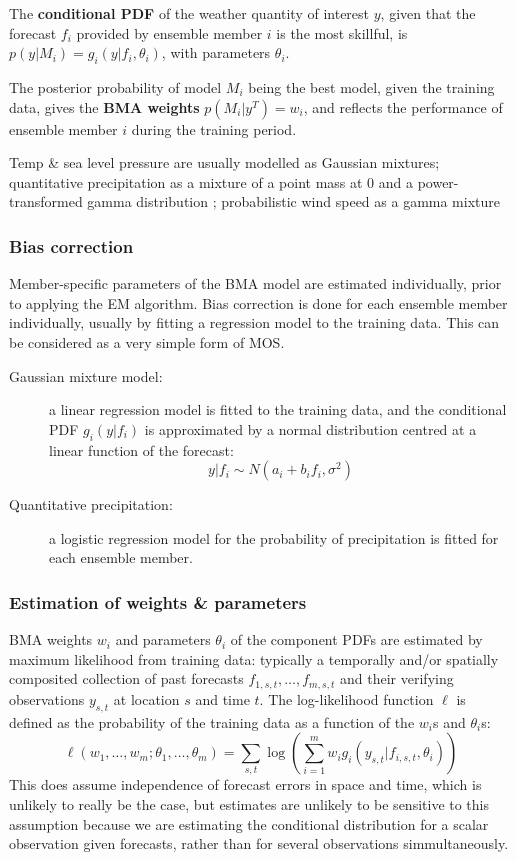 \documentclass[10pt,fleqn]{article}
\begin{document}
The \textbf{conditional PDF} of the weather quantity of interest $y$, given that the forecast $f_i$ provided by ensemble member $i$ is the most skillful, is $p(y|M_i) = g_i(y|f_i, \theta_i)$,  with parameters $\theta_i$.

The posterior probability of model $M_i$ being the best model, given the training data, gives the \textbf{BMA weights} $p(M_i | y^T) = w_i$, and reflects the performance of ensemble member $i$ during the training period.

Temp \& sea level pressure are usually modelled as Gaussian mixtures; quantitative precipitation as a mixture of a point mass at 0 and a power-transformed gamma distribution \cite{Sloughter2007}; probabilistic wind speed as a gamma mixture \cite{Sloughter2010}

\subsubsection{Bias correction}

Member-specific parameters of the BMA model are estimated individually, prior to applying the EM algorithm. Bias correction is done for each ensemble member individually, usually by fitting a regression model to the training data. This can be considered as a very simple form of MOS.

\begin{description}

\item[Gaussian mixture model:] a linear regression model is fitted to the training data, and the conditional PDF $g_i(y|f_i)$ is approximated by a normal distribution centred at a linear function of the forecast: \[y|f_i \sim N(a_i + b_if_i, \sigma^2)\]

\item[Quantitative precipitation:] a logistic regression model for the probability of precipitation is fitted for each ensemble member.
\end{description}

\subsubsection{Estimation of weights \& parameters}

BMA weights $w_i$ and parameters $\theta_i$ of the component PDFs are estimated by maximum likelihood from training data: typically a temporally and/or spatially composited collection of past forecasts $f_{1, s, t}, \dots, f_{m, s, t}$ and their verifying observations $y_{s, t}$ at location $s$ and time $t$. The log-likelihood function $\ell$ is defined as the probability of the training data as a function of the $w_i$s and $\theta_i$s:
%
\[\ell(w_1, \dots, w_m; \theta_1, \dots, \theta_m) = \sum_{s, t} \log \left( \sum_{i=1}^m w_i g_i(y_{s, t} | f_{i, s, t}, \theta_i) \right)\] 
%
This does assume independence of forecast errors in space and time, which is unlikely to really be the case, but estimates are unlikely to be sensitive to this assumption because we are estimating the conditional distribution for a scalar observation given forecasts, rather than for several observations simmultaneously.
\end{document}
